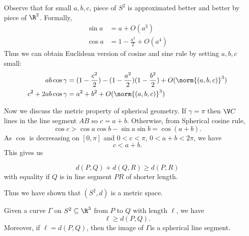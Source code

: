 \documentclass[a4paper]{article}
\theoremstyle{definition}
\begin{document}
\begin{remark}
  Observe that for small \(a, b, c\), piece of \(S^2\) is approximated better and better by piece of \(\R^2\). Formally,
  \begin{align*}
    \sin a &= a + O(a^3) \\
    \cos a &= 1 - \frac{a^2}{2} + O(a^4)
  \end{align*}
  Thus we can obtain Euclidean version of cosine and sine rule by setting \(a, b, c\) small:
  \begin{align*}
    ab\cos \gamma &= (1 - \frac{c^2}{2}) - (1 - \frac{a^2}{2})(1 - \frac{b^2}{2}) + O(\norm{(a, b, c)}^3) \\
    c^2 + 2ab \cos \gamma &= a^2 + b^2 + O(\norm{(a, b, c)}^3)
  \end{align*}
\end{remark}

Now we discuss the metric property of spherical geometry. If \(\gamma = \pi\) then \(\V C\) lines in the line segment \(AB\) so \(c = a + b\). Otherwise, from Spherical cosine rule,
\[
  \cos c > \cos a \cos b - \sin a \sin b = \cos(a + b).
\]
As \(\cos\) is decresasing on \([0, \pi]\) and \(0 < c < \pi\), \(0 < a + b < 2\pi\), we have
\[
  c < a + b.
\]
This gives us

\begin{corollary}
  \[
    d(P, Q) + d(Q, R) \geq d(P, R)
  \]
  with equality if \(Q\) is in line segment \(PR\) of shorter length.
\end{corollary}
Thus we have shown that \((S^2, d)\) is a metric space.

\begin{proposition}
  Given a curve \(\Gamma\) on \(S^2 \subseteq \R^3\) from \(P\) to \(Q\) with length \(\ell\), we have
  \[
    \ell \geq d(P, Q).
  \]
  Moreover, if \(\ell = d(P, Q)\), then the image of \(\Gamma\)is a spherical line segment.
\end{proposition}
\end{document}
